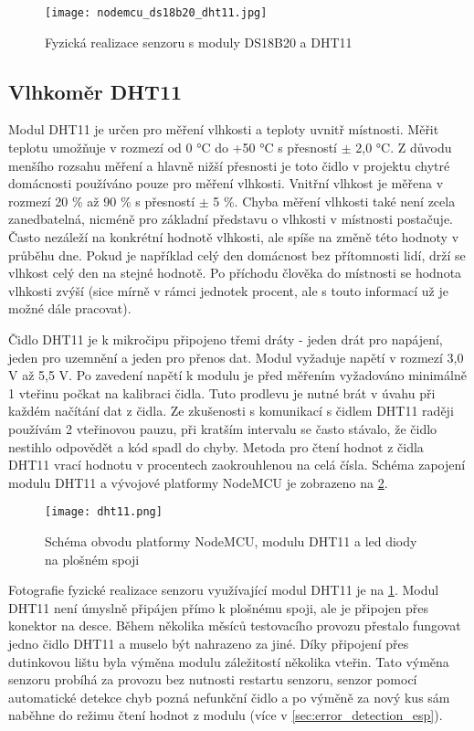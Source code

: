\begin{figure}[H]
  \centering
  \texttt{[image: nodemcu\_ds18b20\_dht11.jpg]}
  \caption{Fyzická realizace senzoru s moduly DS18B20 a DHT11}
  \label{fig:nodemcu_ds18b20_dht11}
\end{figure} 

\subsection{Vlhkoměr DHT11}

Modul DHT11 je určen pro měření vlhkosti a teploty uvnitř místnosti. Měřit teplotu umožňuje v rozmezí od 0 \si{\degree}C do +50 \si{\degree}C s přesností $\pm$ 2,0 \si{\degree}C. Z důvodu menšího rozsahu měření a hlavně nižší přesnosti je toto čidlo v projektu chytré domácnosti používáno pouze pro měření vlhkosti. Vnitřní vlhkost je měřena v rozmezí 20 \% až 90 \% s přesností $\pm$ 5 \%. Chyba měření vlhkosti také není zcela zanedbatelná, nicméně pro základní představu o vlhkosti v místnosti postačuje. Často nezáleží na konkrétní hodnotě vlhkosti, ale spíše na změně této hodnoty v průběhu dne. Pokud je například celý den domácnost bez přítomnosti lidí, drží se vlhkost celý den na stejné hodnotě. Po příchodu člověka do místnosti se hodnota vlhkosti zvýší (sice mírně v rámci jednotek procent, ale s touto informací už je možné dále pracovat). \par
Čidlo DHT11 je k mikročipu připojeno třemi dráty - jeden drát pro napájení, jeden pro uzemnění a jeden pro přenos dat. Modul vyžaduje napětí v rozmezí 3,0 V až 5,5 V. Po zavedení napětí k modulu je před měřením vyžadováno minimálně 1 vteřinu počkat na kalibraci čidla. Tuto prodlevu je nutné brát v úvahu při každém načítání dat z čidla. Ze zkušenosti s komunikací s čidlem DHT11 raději používám 2 vteřinovou pauzu, při kratším intervalu se často stávalo, že čidlo nestihlo odpovědět a kód spadl do chyby. Metoda pro čtení hodnot z čidla DHT11 vrací hodnotu v procentech zaokrouhlenou na celá čísla. Schéma zapojení modulu DHT11 a vývojové platformy NodeMCU je zobrazeno na \cref{fig:schema_esp_dht11}. \par

\begin{figure}[H]
  \centering
  \texttt{[image: dht11.png]}
  \caption{Schéma obvodu platformy NodeMCU, modulu DHT11 a led diody na plošném spoji}
  \label{fig:schema_esp_dht11}
\end{figure}

Fotografie fyzické realizace senzoru využívající modul DHT11 je na \cref{fig:nodemcu_ds18b20_dht11}. Modul DHT11 není úmyslně připájen přímo k plošnému spoji, ale je připojen přes konektor na desce. Během několika měsíců testovacího provozu přestalo fungovat jedno čidlo DHT11 a muselo být nahrazeno za jiné. Díky připojení přes dutinkovou lištu byla výměna modulu záležitostí několika vteřin. Tato výměna senzoru probíhá za provozu bez nutnosti restartu senzoru, senzor pomocí automatické detekce chyb pozná nefunkční čidlo a po výměně za nový kus sám naběhne do režimu čtení hodnot z modulu (více v \cref{sec:error_detection_esp}).

